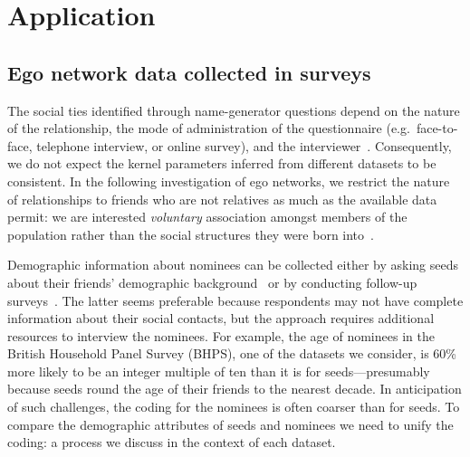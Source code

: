 \documentclass{scrartcl}
\begin{document}
\section{Application}

\subsection{Ego network data collected in surveys\label{sec:application}}

The social ties identified through name-generator questions depend on the nature of the relationship, the mode of administration of the questionnaire (e.g.\ face-to-face, telephone interview, or online survey), and the interviewer~\cite{Marin2004,Eagle2015}. Consequently, we do not expect the kernel parameters inferred from different datasets to be consistent. In the following investigation of ego networks, we restrict the nature of relationships to friends who are not relatives as much as the available data permit: we are interested \emph{voluntary} association amongst members of the population rather than the social structures they were born into~\cite{Kalmijn2007}.

Demographic information about nominees can be collected either by asking seeds about their friends' demographic background~\cite{Marsden1987,McPherson2006} or by conducting follow-up surveys~\cite{Johnson1989}. The latter seems preferable because respondents may not have complete information about their social contacts, but the approach requires additional resources to interview the nominees. %
For example, the age of nominees in the British Household Panel Survey (BHPS), one of the datasets we consider, is 60\% more likely to be an integer multiple of ten than it is for seeds---presumably because seeds round the age of their friends to the nearest decade. In anticipation of such challenges, the coding for the nominees is often coarser than for seeds. To compare the demographic attributes of seeds and nominees we need to unify the coding: a process we discuss in the context of each dataset.
\end{document}
